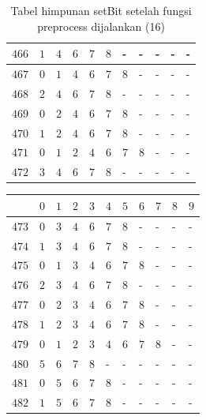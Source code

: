 \begin{appendices}
\begin{table}[H]
\begin{tabular} {|l|l|l|l|l|l|l|l|l|l|l|}
  		$ 466 $ & $ 1 $ &$ 4 $ &$ 6 $ &$ 7 $ &$ 8 $ & - &  - &  - &  - &  -   \\ \hline
  		$ 467 $ & $ 0 $ &$ 1 $ &$ 4 $ &$ 6 $ &$ 7 $ &$ 8 $ & - &  - &  - &  -   \\ \hline
  		$ 468 $ & $ 2 $ &$ 4 $ &$ 6 $ &$ 7 $ &$ 8 $ & - &  - &  - &  - &  -   \\ \hline
  		$ 469 $ & $ 0 $ &$ 2 $ &$ 4 $ &$ 6 $ &$ 7 $ &$ 8 $ & - &  - &  - &  -   \\ \hline
  		$ 470 $ & $ 1 $ &$ 2 $ &$ 4 $ &$ 6 $ &$ 7 $ &$ 8 $ & - &  - &  - &  -   \\ \hline
  		$ 471 $ & $ 0 $ &$ 1 $ &$ 2 $ &$ 4 $ &$ 6 $ &$ 7 $ &$ 8 $ & - &  - &  -   \\ \hline
  		$ 472 $ & $ 3 $ &$ 4 $ &$ 6 $ &$ 7 $ &$ 8 $ & - &  - &  - &  - &  -   \\ \hline  		
  	\end{tabular}\caption{Tabel himpunan setBit setelah fungsi preprocess dijalankan (16)}
  	\label{tab:setbit_16}
  \end{table}
  \begin{table}[H]
  	\centering
  	\begin{tabular} {|l|l|l|l|l|l|l|l|l|l|l|} \hline
  		\backslashbox{$Num$}{$index$} & $ 0 $ & $ 1 $ & $ 2 $ & $ 3 $ & $ 4 $ & $ 5 $ & $ 6 $ & $ 7 $ & $ 8 $ & $ 9 $ \\ \hline
  		$ 473 $ & $ 0 $ &$ 3 $ &$ 4 $ &$ 6 $ &$ 7 $ &$ 8 $ & - &  - &  - &  -   \\ \hline
  		$ 474 $ & $ 1 $ &$ 3 $ &$ 4 $ &$ 6 $ &$ 7 $ &$ 8 $ & - &  - &  - &  -   \\ \hline
  		$ 475 $ & $ 0 $ &$ 1 $ &$ 3 $ &$ 4 $ &$ 6 $ &$ 7 $ &$ 8 $ & - &  - &  -   \\ \hline
  		$ 476 $ & $ 2 $ &$ 3 $ &$ 4 $ &$ 6 $ &$ 7 $ &$ 8 $ & - &  - &  - &  -   \\ \hline
  		$ 477 $ & $ 0 $ &$ 2 $ &$ 3 $ &$ 4 $ &$ 6 $ &$ 7 $ &$ 8 $ & - &  - &  -   \\ \hline
  		$ 478 $ & $ 1 $ &$ 2 $ &$ 3 $ &$ 4 $ &$ 6 $ &$ 7 $ &$ 8 $ & - &  - &  -   \\ \hline
  		$ 479 $ & $ 0 $ &$ 1 $ &$ 2 $ &$ 3 $ &$ 4 $ &$ 6 $ &$ 7 $ &$ 8 $ & - &  -   \\ \hline
  		$ 480 $ & $ 5 $ &$ 6 $ &$ 7 $ &$ 8 $ & - &  - &  - &  - &  - &  -   \\ \hline
  		$ 481 $ & $ 0 $ &$ 5 $ &$ 6 $ &$ 7 $ &$ 8 $ & - &  - &  - &  - &  -   \\ \hline
  		$ 482 $ & $ 1 $ &$ 5 $ &$ 6 $ &$ 7 $ &$ 8 $ & - &  - &  - &  - &  -   \\ \hline

\end{tabular}
\end{table}
\end{appendices}
